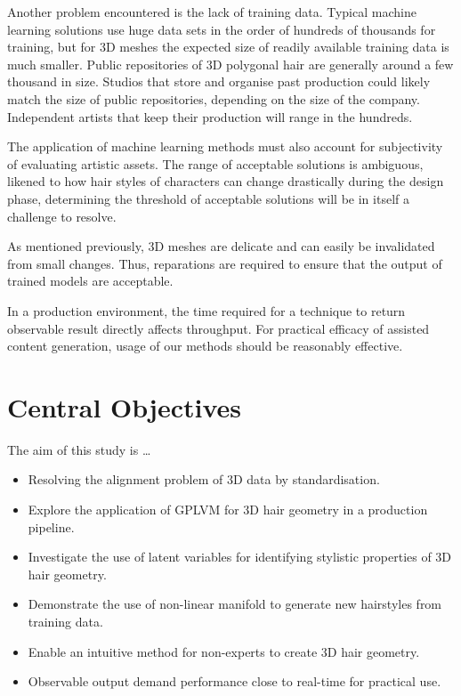 \documentclass[ %
                    author={Dillon Keith Diep},
                supervisor={Dr. Carl Henrik Ek},
                    degree={MEng},
                     title={Assisted Content Generation for 3D Hair Geometry},
                  subtitle={[INCOMPLETE DRAFT, CONTAINS NOTES FROM RESEARCH]},
                      type={Research},
                      year={2014} ]{dissertation}
\begin{document}
Another problem encountered is the lack of training data. Typical machine learning solutions use huge data sets in the order of hundreds of thousands for training, but for 3D meshes the expected size of readily available training data is much smaller. Public repositories of 3D polygonal hair are generally around a few thousand in size. Studios that store and organise past production could likely match the size of public repositories, depending on the size of the company. Independent artists that keep their production will range in the hundreds.
\cite{tsr}

The application of machine learning methods must also account for subjectivity of evaluating artistic assets. The range of acceptable solutions is ambiguous, likened to how hair styles of characters can change drastically during the design phase, determining the threshold of acceptable solutions will be in itself a challenge to resolve.

As mentioned previously, 3D meshes are delicate and can easily be invalidated from small changes. Thus, reparations are required to ensure that the output of trained models are acceptable.

In a production environment, the time required for a technique to return observable result directly affects throughput. For practical efficacy of assisted content generation, usage of our methods should be reasonably effective.

\section{Central Objectives}
\noindent
The aim of this study is …
\begin{itemize}
\item Resolving the alignment problem of 3D data by standardisation.
\item Explore the application of GPLVM for 3D hair geometry in a production pipeline.
\item Investigate the use of latent variables for identifying stylistic properties of 3D hair geometry.
\item Demonstrate the use of non-linear manifold to generate new hairstyles from training data.
\item Enable an intuitive method for non-experts to create 3D hair geometry.
\item Observable output demand performance close to real-time for practical use.
\end{itemize}
\end{document}
